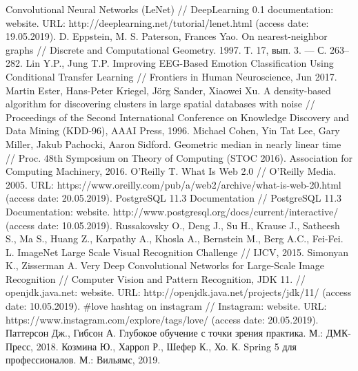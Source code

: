 \begingroup 
\renewcommand{\section}[2]{\anonsection{Список использованных источников}}
\onehalfspacing
\begin{thebibliography}{00}
    Convolutional Neural Networks (LeNet) // 
    DeepLearning 0.1 documentation: website. 
    URL: http://deeplearning.net/tutorial/lenet.html 
    (access date: 19.05.2019).
    D. Eppstein, M. S. Paterson, Frances Yao. 
    On nearest-neighbor graphs // 
    Discrete and Computational Geometry. 
    1997. Т. 17, вып. 3. — С. 263–282.
    Lin Y.P., Jung T.P.
    Improving EEG-Based Emotion Classification Using Conditional Transfer Learning //
    Frontiers in Human Neuroscience, 
    Jun 2017.
    Martin Ester, Hans-Peter Kriegel, Jörg Sander, Xiaowei Xu.
    A density-based algorithm for discovering clusters in large spatial databases with noise // 
    Proceedings of the Second International Conference on Knowledge Discovery and Data Mining (KDD-96),
    AAAI Press, 
    1996.
    Michael Cohen, Yin Tat Lee, Gary Miller, Jakub Pachocki, Aaron Sidford. 
    Geometric median in nearly linear time // 
    Proc. 48th Symposium on Theory of Computing (STOC 2016). Association for Computing Machinery, 
    2016.
    O'Reilly T. What Is Web 2.0 // 
    O’Reilly Media. 
    2005. 
    URL: https://www.oreilly.com/pub/a/web2/archive/what-is-web-20.html 
    (access date: 20.05.2019).
    PostgreSQL 11.3 Documentation // 
    PostgreSQL 11.3 Documentation: website. 
    http://www.postgresql.org/docs/current/interactive/
    (access date: 10.05.2019).
    Russakovsky O., Deng J., Su H., Krause J., Satheesh S., Ma S., Huang Z., Karpathy A., Khosla A., Bernstein M., Berg A.C., Fei-Fei. L. 
    ImageNet Large Scale Visual Recognition Challenge // 
    IJCV, 
    2015.
    Simonyan K., Zisserman A. 
    Very Deep Convolutional Networks for Large-Scale Image Recognition // 
    Computer Vision and Pattern Recognition, 
    JDK 11. // 
    openjdk.java.net: website. 
    URL: http://openjdk.java.net/projects/jdk/11/
    (access date: 10.05.2019).
    \#love hashtag on instagram // 
    Instagram: website. 
    URL: https://www.instagram.com/explore/tags/love/ 
    (access date: 20.05.2019).
    Паттерсон Дж., Гибсон А. 
    Глубокое обучение с точки зрения практика.
    М.: ДМК-Пресс, 
    2018.
    Козмина Ю., Харроп Р., Шефер К., Хо. К. 
    Spring 5 для профессионалов. 
    М.: Вильямс, 
    2019.

\end{thebibliography}
\endgroup

\clearpage